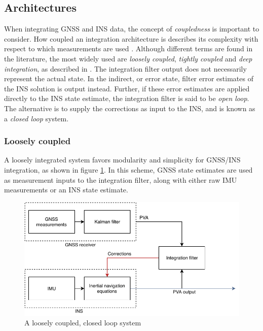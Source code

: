 


\subsection{Architectures}
    When integrating GNSS and INS data, the concept of \textit{coupledness} is important to consider. How coupled an integration architecture is describes its complexity with respect to which measurements are used \cite{groves2013principles, noureldin2012fundamentals}. Although different terms are found in the literature, the most widely used are \textit{loosely coupled}, \textit{tightly coupled} and \textit{deep integration}, as described in \cite{groves2013principles}. The integration filter output does not necessarily represent the actual state. In the indirect, or error state, filter error estimates of the INS solution is output instead. Further, if these error estimates are applied directly to the INS state estimate, the integration filter is said to be \textit{open loop}. The alternative is to supply the corrections as input to the INS, and is known as a \textit{closed loop} system.
    
    \subsubsection{Loosely coupled}
    A loosely integrated system favors modularity and simplicity for GNSS/INS integration, as shown in figure \ref{fig:loosely_coupled}. In this scheme, GNSS state estimates are used as measurement inputs to the integration filter, along with either raw IMU measurements or an INS state estimate. \\
    
    \begin{figure}
        \centering
        \includegraphics[scale=0.8]{Theory/bilder/loosely-coupled.pdf}
        \caption{A loosely coupled, closed loop system}
        \label{fig:loosely_coupled}
    \end{figure}
    
